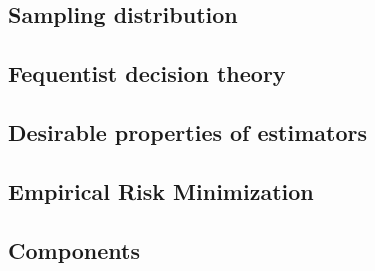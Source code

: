 \subsection{Sampling distribution}


\subsection{Fequentist decision theory}


\subsection{Desirable properties of estimators}


\subsection{Empirical Risk Minimization}


\subsection{Components}



